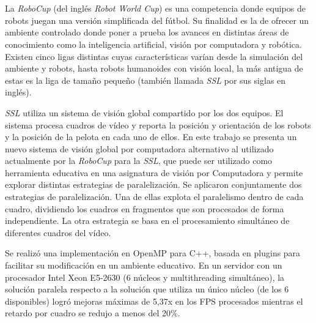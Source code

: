 \ \\
\ \\
\label{pagresum}
\\
\ \\
\ \\

\ \\

\ \\

La \emph{RoboCup} (del inglés \emph{Robot World Cup}) es una competencia donde
equipos de robots juegan una versión simplificada del fútbol. Su finalidad es
la de ofrecer un ambiente controlado donde poner a prueba los avances en
distintas áreas de conocimiento como la inteligencia artificial, visión por
computadora y robótica. Existen cinco ligas distintas cuyas características
varían desde la simulación del ambiente y robots, hasta robots humanoides con
visión local, la más antigua de estas es la liga de tamaño pequeño (también
llamada \emph{SSL} por sus siglas en inglés).

\emph{SSL} utiliza un sistema de visión global compartido por los dos equipos.
El sistema procesa cuadros de vídeo y reporta la posición y orientación de los
robots y la posición de la pelota en cada uno de ellos. En este trabajo se
presenta un nuevo sistema de visión global por computadora alternativo al
utilizado actualmente por la \emph{RoboCup} para la \emph{SSL}, que puede ser
utilizado como herramienta educativa en una asignatura de visión por
Computadora y permite explorar distintas estrategias de paralelización. Se
aplicaron conjuntamente dos estrategias de paralelización. Una de ellas
explota el paralelismo dentro de cada cuadro, dividiendo los cuadros en
fragmentos que son procesados de forma independiente. La otra estrategia se
basa en el procesamiento simultáneo de diferentes cuadros del vídeo.

Se realizó una implementación en OpenMP para C++, basada en plugins para
facilitar su modificación en un ambiente educativo. En un servidor con un
procesador Intel Xeon E5-2630 (6 núcleos y multithreading simultáneo), la
solución paralela respecto a la solución que utiliza un único núcleo (de los 6
disponibles) logró mejoras máximas de 5,37x en los FPS procesados mientras el
retardo por cuadro se redujo a menos del 20\%.

\vfill
\pagebreak
